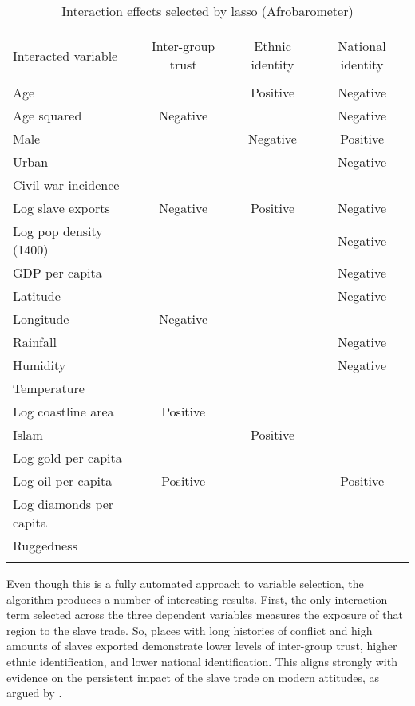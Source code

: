 \begin{table}[!htbp] \centering 
  \caption{Interaction effects selected by lasso (Afrobarometer)} 
  \label{lasso_1} 
\footnotesize 
\begin{tabular}{@{\extracolsep{2pt}} lccc} 
\\[-1.8ex]\hline 
\hline \\[-1.8ex] 
Interacted variable & Inter-group trust & Ethnic identity & National identity \\ 
\hline \\[-1.8ex] 
Age &   & Positive & Negative \\ 
Age squared & Negative &   & Negative \\ 
Male &   & Negative & Positive \\ 
Urban &   &   & Negative \\ 
Civil war incidence &   &   &   \\ 
Log slave exports & Negative & Positive & Negative \\ 
Log pop density (1400) &   &   & Negative \\ 
GDP per capita &   &   & Negative \\ 
Latitude &   &   & Negative \\ 
Longitude & Negative &   &   \\ 
Rainfall &   &   & Negative \\ 
Humidity &   &   & Negative \\ 
Temperature &   &   &   \\ 
Log coastline area & Positive &   &   \\ 
Islam &   & Positive &   \\ 
Log gold per capita &   &   &   \\ 
Log oil per capita & Positive &   & Positive \\ 
Log diamonds per capita &   &   &   \\ 
Ruggedness &   &   &   \\ 
\hline \\[-1.8ex] 
\end{tabular} 
\end{table} 

Even though this is a fully automated approach to variable selection, the algorithm produces a number of interesting results. First, the only interaction term selected across the three dependent variables measures the exposure of that region to the slave trade. So, places with long histories of conflict and high amounts of slaves exported demonstrate lower levels of inter-group trust, higher ethnic identification, and lower national identification. This aligns strongly with evidence on the persistent impact of the slave trade on modern attitudes, as argued by \citet{NunnWantchekon2011}. 

